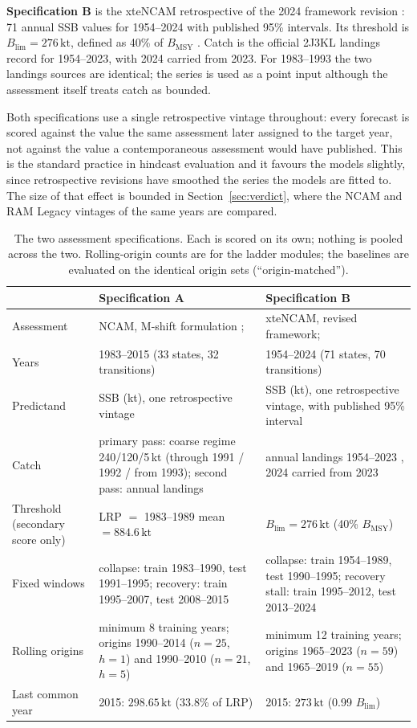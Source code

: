 \documentclass[preprint,11pt,authoryear]{elsarticle}
\theoremstyle{definition}
\theoremstyle{remark}
\newcommand{\kt}{\,\mathrm{kt}}
\newcommand{\Blim}{B_{\mathrm{lim}}}
\begin{document}
\textbf{Specification B} is the xteNCAM retrospective of the 2024 framework revision \citep[Table 17]{Regular2025}: 71 annual SSB values for 1954--2024 with published 95\% intervals. Its threshold is $\Blim = 276\kt$, defined as 40\% of $B_{\mathrm{MSY}}$ \citep{DFO2024a}. Catch is the official 2J3KL landings record \citep[Table 1]{Regular2025} for 1954--2023, with 2024 carried from 2023. For 1983--1993 the two landings sources are identical; the series is used as a point input although the assessment itself treats catch as bounded.

Both specifications use a single retrospective vintage throughout: every forecast is scored against the value the same assessment later assigned to the target year, not against the value a contemporaneous assessment would have published. This is the standard practice in hindcast evaluation and it favours the models slightly, since retrospective revisions have smoothed the series the models are fitted to. The size of that effect is bounded in Section~\ref{sec:verdict}, where the NCAM and RAM Legacy vintages of the same years are compared.

\begin{table}[!htb]
\centering\small
\caption{The two assessment specifications. Each is scored on its own; nothing is pooled across the two. Rolling-origin counts are for the ladder modules; the baselines are evaluated on the identical origin sets (``origin-matched'').}
\label{tab:specs}
\begin{tabularx}{\textwidth}{@{}>{\raggedright\arraybackslash}p{}LL@{}}
\toprule
 & Specification A & Specification B \\
\midrule
Assessment & NCAM, M-shift formulation \citep{Cadigan2016}; \citet[Table A2]{DFO2016} & xteNCAM, revised framework; \citet[Table 17]{Regular2025} \\
Years & 1983--2015 (33 states, 32 transitions) & 1954--2024 (71 states, 70 transitions) \\
Predictand & SSB (kt), one retrospective vintage & SSB (kt), one retrospective vintage, with published 95\% interval \\
Catch & primary pass: coarse regime 240/120/5\,kt (through 1991 / 1992 / from 1993); second pass: annual landings \citep{Schijns2021} & annual landings 1954--2023 \citep[Table 1]{Regular2025}, 2024 carried from 2023 \\
Threshold (secondary score only) & LRP $=$ 1983--1989 mean $= 884.6\kt$ & $\Blim = 276\kt$ (40\% $B_{\mathrm{MSY}}$) \\
Fixed windows & collapse: train 1983--1990, test 1991--1995; recovery: train 1995--2007, test 2008--2015 & collapse: train 1954--1989, test 1990--1995; recovery stall: train 1995--2012, test 2013--2024 \\
Rolling origins & minimum 8 training years; origins 1990--2014 ($n=25$, $h=1$) and 1990--2010 ($n=21$, $h=5$) & minimum 12 training years; origins 1965--2023 ($n=59$) and 1965--2019 ($n=55$) \\
Last common year & 2015: $298.65\kt$ (33.8\% of LRP) & 2015: $273\kt$ (0.99 $\Blim$) \\
\bottomrule
\end{tabularx}
\end{table}
\end{document}

